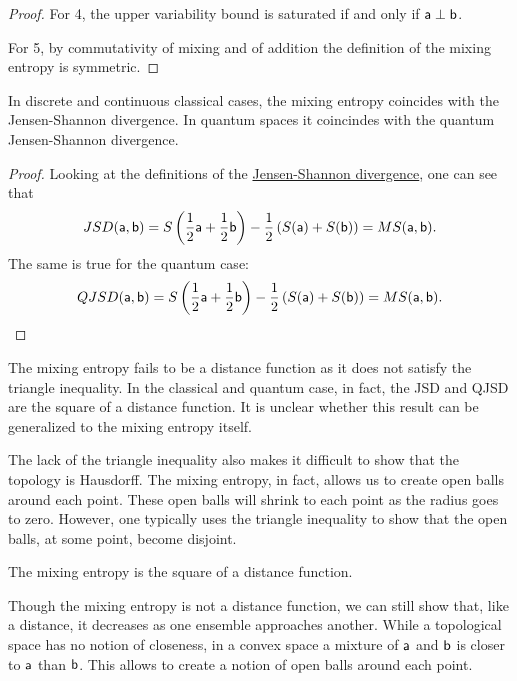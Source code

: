 \begin{mathSection}
\begin{proof}
	For 4, the upper variability bound is saturated if and only if $\ens[a] \ortho \ens[b]$.
	
	For 5, by commutativity of mixing and of addition the definition of the mixing entropy is symmetric.
\end{proof}

\begin{prop}
	In discrete and continuous classical cases, the mixing entropy coincides with the Jensen-Shannon divergence. In quantum spaces it coincindes with the quantum Jensen-Shannon divergence.
\end{prop}

\begin{proof}
	Looking at the definitions of the \href{https://en.wikipedia.org/wiki/Jensen%E2%80%93Shannon_divergence}{Jensen-Shannon divergence}, one can see that
	$$ JSD(\ens[a], \ens[b]) = S\left(\frac{1}{2}\ens[a] + \frac{1}{2}\ens[b] \right)  - \frac{1}{2} \left(S(\ens[a]) + S(\ens[b])\right) = MS(\ens[a], \ens[b]).$$
	The same is true for the quantum case:
	$$ QJSD(\ens[a], \ens[b]) = S\left(\frac{1}{2}\ens[a] + \frac{1}{2}\ens[b] \right)  - \frac{1}{2} \left(S(\ens[a]) + S(\ens[b])\right) = MS(\ens[a], \ens[b]).$$
\end{proof}

\begin{remark}
	The mixing entropy fails to be a distance function as it does not satisfy the triangle inequality. In the classical and quantum case, in fact, the JSD and QJSD are the square of a distance function. It is unclear whether this result can be generalized to the mixing entropy itself.
	
	The lack of the triangle inequality also makes it difficult to show that the topology is Hausdorff. The mixing entropy, in fact, allows us to create open balls around each point. These open balls will shrink to each point as the radius goes to zero. However, one typically uses the triangle inequality to show that the open balls, at some point, become disjoint.
\end{remark}

\begin{conj}
	The mixing entropy is the square of a distance function.
\end{conj}
\end{mathSection}

Though the mixing entropy is not a distance function, we can still show that, like a distance, it decreases as one ensemble approaches another. While a topological space has no notion of closeness, in a convex space a mixture of $\ens[a]$ and $\ens[b]$ is closer to $\ens[a]$ than $\ens[b]$. This allows to create a notion of open balls around each point.

